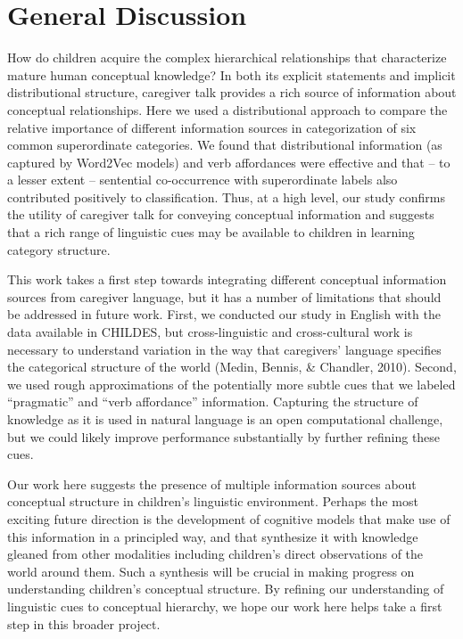 \documentclass[10pt, letterpaper]{article}
\begin{document}
\hypertarget{general-discussion}{%
\section{General Discussion}\label{general-discussion}}

How do children acquire the complex hierarchical relationships that
characterize mature human conceptual knowledge? In both its explicit
statements and implicit distributional structure, caregiver talk
provides a rich source of information about conceptual relationships.
Here we used a distributional approach to compare the relative
importance of different information sources in categorization of six
common superordinate categories. We found that distributional
information (as captured by Word2Vec models) and verb affordances were
effective and that -- to a lesser extent -- sentential co-occurrence
with superordinate labels also contributed positively to classification.
Thus, at a high level, our study confirms the utility of caregiver talk
for conveying conceptual information and suggests that a rich range of
linguistic cues may be available to children in learning category
structure.

This work takes a first step towards integrating different conceptual
information sources from caregiver language, but it has a number of
limitations that should be addressed in future work. First, we conducted
our study in English with the data available in CHILDES, but
cross-linguistic and cross-cultural work is necessary to understand
variation in the way that caregivers' language specifies the categorical
structure of the world (Medin, Bennis, \& Chandler, 2010). Second, we
used rough approximations of the potentially more subtle cues that we
labeled ``pragmatic'' and ``verb affordance'' information. Capturing the
structure of knowledge as it is used in natural language is an open
computational challenge, but we could likely improve performance
substantially by further refining these cues.

Our work here suggests the presence of multiple information sources
about conceptual structure in children's linguistic environment. Perhaps
the most exciting future direction is the development of cognitive
models that make use of this information in a principled way, and that
synthesize it with knowledge gleaned from other modalities including
children's direct observations of the world around them. Such a
synthesis will be crucial in making progress on understanding children's
conceptual structure. By refining our understanding of linguistic cues
to conceptual hierarchy, we hope our work here helps take a first step
in this broader project.
\end{document}
